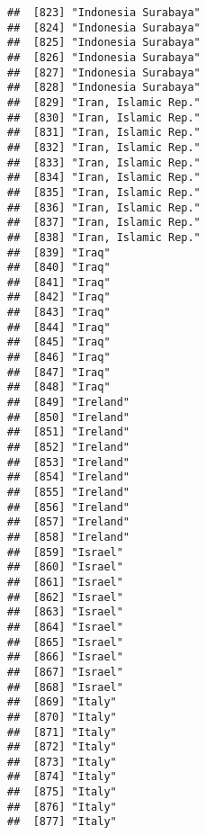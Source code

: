 \documentclass[]{article}
\begin{document}
\begin{verbatim}
##  [823] "Indonesia Surabaya"                 
##  [824] "Indonesia Surabaya"                 
##  [825] "Indonesia Surabaya"                 
##  [826] "Indonesia Surabaya"                 
##  [827] "Indonesia Surabaya"                 
##  [828] "Indonesia Surabaya"                 
##  [829] "Iran, Islamic Rep."                 
##  [830] "Iran, Islamic Rep."                 
##  [831] "Iran, Islamic Rep."                 
##  [832] "Iran, Islamic Rep."                 
##  [833] "Iran, Islamic Rep."                 
##  [834] "Iran, Islamic Rep."                 
##  [835] "Iran, Islamic Rep."                 
##  [836] "Iran, Islamic Rep."                 
##  [837] "Iran, Islamic Rep."                 
##  [838] "Iran, Islamic Rep."                 
##  [839] "Iraq"                               
##  [840] "Iraq"                               
##  [841] "Iraq"                               
##  [842] "Iraq"                               
##  [843] "Iraq"                               
##  [844] "Iraq"                               
##  [845] "Iraq"                               
##  [846] "Iraq"                               
##  [847] "Iraq"                               
##  [848] "Iraq"                               
##  [849] "Ireland"                            
##  [850] "Ireland"                            
##  [851] "Ireland"                            
##  [852] "Ireland"                            
##  [853] "Ireland"                            
##  [854] "Ireland"                            
##  [855] "Ireland"                            
##  [856] "Ireland"                            
##  [857] "Ireland"                            
##  [858] "Ireland"                            
##  [859] "Israel"                             
##  [860] "Israel"                             
##  [861] "Israel"                             
##  [862] "Israel"                             
##  [863] "Israel"                             
##  [864] "Israel"                             
##  [865] "Israel"                             
##  [866] "Israel"                             
##  [867] "Israel"                             
##  [868] "Israel"                             
##  [869] "Italy"                              
##  [870] "Italy"                              
##  [871] "Italy"                              
##  [872] "Italy"                              
##  [873] "Italy"                              
##  [874] "Italy"                              
##  [875] "Italy"                              
##  [876] "Italy"                              
##  [877] "Italy"                              

\end{verbatim}
\end{document}
